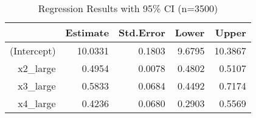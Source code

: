 \begin{table}[ht]
\centering
\caption{Regression Results with 95\% CI (n=3500)} 
\label{tab:regression_large}
\begin{tabular}{rrrrr}
  \hline
 & Estimate & Std.Error & Lower & Upper \\ 
  \hline
(Intercept) & 10.0331 & 0.1803 & 9.6795 & 10.3867 \\ 
  x2\_large & 0.4954 & 0.0078 & 0.4802 & 0.5107 \\ 
  x3\_large & 0.5833 & 0.0684 & 0.4492 & 0.7174 \\ 
  x4\_large & 0.4236 & 0.0680 & 0.2903 & 0.5569 \\ 
   \hline
\end{tabular}
\end{table}
